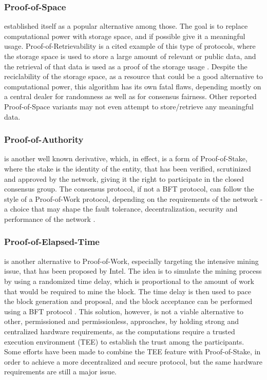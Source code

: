 \documentclass[journal]{IEEEtran}
\begin{document}
\subsubsection{Proof-of-Space} established itself as a popular alternative among those.
The goal is to replace computational power with storage space,
and if possible give it a meaningful usage. Proof-of-Retrievability is
a cited example of this type of protocols, where the storage space is
used to store a large amount of relevant or public data, and the retrieval of that data
is used as a proof of the storage usage \cite{juels2007pors}. Despite the reciclability 
of the storage space, as a resource that could be a good alternative
to computational power, this algorithm has its own fatal flaws, depending
mostly on a central dealer for randomness as well as for consensus fairness.
Other reported Proof-of-Space variants may not even attempt to store/retrieve any meaningful data.

\subsubsection{Proof-of-Authority} is another well known derivative,
which, in effect, is a form of Proof-of-Stake, where the stake is the 
identity of the entity, that has been verified, scrutinized and
approved by the network, giving it the right to participate in the
closed consensus group. The consensus protocol, if not a BFT protocol, 
can follow the style of a Proof-of-Work protocol, depending on the 
requirements of the network - a choice that may shape the fault tolerance,
decentralization, security and performance of the network \cite{survey-dist-consensus}.

\subsubsection{Proof-of-Elapsed-Time} is another alternative to Proof-of-Work,
especially targeting the intensive mining issue, that has been proposed 
by Intel. The idea is to simulate the mining process by using a
randomized time delay, which is proportional to the amount of work
that would be required to mine the block. The time delay is then used to pace the
block generation and proposal, and the block acceptance can be performed
using a BFT protocol \cite{olson2018sawtooth}. This solution, however,
is not a viable alternative to other, permissioned and permissionless, approaches, 
by holding strong and centralized hardware requirements, 
as the computations require a trusted execution environment
(TEE) to establish the trust among the participants. Some efforts have been made
to combine the TEE feature with Proof-of-Stake, in order to achieve a
more decentralized and secure protocol, but the 
same hardware requirements are still a major issue.
\end{document}

